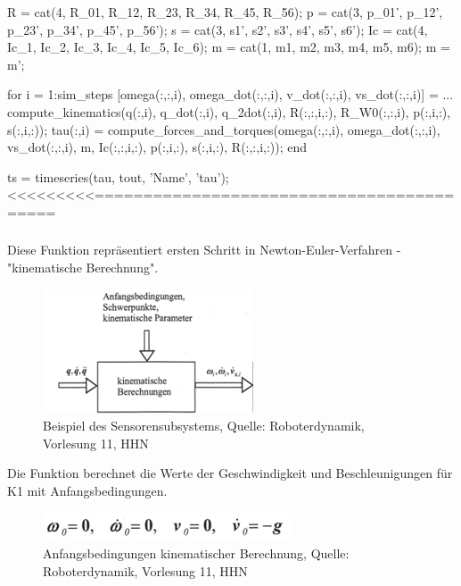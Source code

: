 	R = cat(4, R_01, R_12, R_23, R_34, R_45, R_56);
	p = cat(3, p_01', p_12', p_23', p_34', p_45', p_56');
	s = cat(3, s1', s2', s3', s4', s5', s6');
	Ic = cat(4, Ic_1, Ic_2, Ic_3, Ic_4, Ic_5, Ic_6);
	m = cat(1, m1, m2, m3, m4, m5, m6);
	m = m';

	for i = 1:sim_steps
		[omega(:,:,i), omega_dot(:,:,i), v_dot(:,:,i), vs_dot(:,:,i)] = ...
			compute_kinematics(q(:,i), q_dot(:,i), q_2dot(:,i), R(:,:,i,:), R_W0(:,:,i), p(:,i,:), s(:,i,:));
		tau(:,i) = compute_forces_and_torques(omega(:,:,i), omega_dot(:,:,i), vs_dot(:,:,i), m, Ic(:,:,i,:), p(:,i,:), s(:,i,:), R(:,:,i,:));
	end

	ts = timeseries(tau, tout, 'Name', 'tau');
<<<<<<<<<==========================================

	\subsubsection{}

Diese Funktion repräsentiert ersten Schritt in Newton-Euler-Verfahren - "kinematische Berechnung".

	\begin{figure}[!htbp]
		\centering
		\includegraphics[width=1\linewidth]{grafic/compute_kinematics_diagramm}
		\caption{Beispiel des Sensorensubsystems, Quelle: Roboterdynamik, Vorlesung 11, HHN}
		\label{fig:sensoren_subsystem}
	\end{figure}

Die Funktion berechnet die Werte der Geschwindigkeit und Beschleunigungen für K1 mit Anfangsbedingungen. 

	\begin{figure}[!htbp]
		\centering
		\includegraphics[width=1\linewidth]{grafic/anfangsbedingungen}
		\caption{Anfangsbedingungen kinematischer Berechnung, Quelle: Roboterdynamik, Vorlesung 11, HHN}
		\label{fig:anfangsbedingungen}
	\end{figure}


